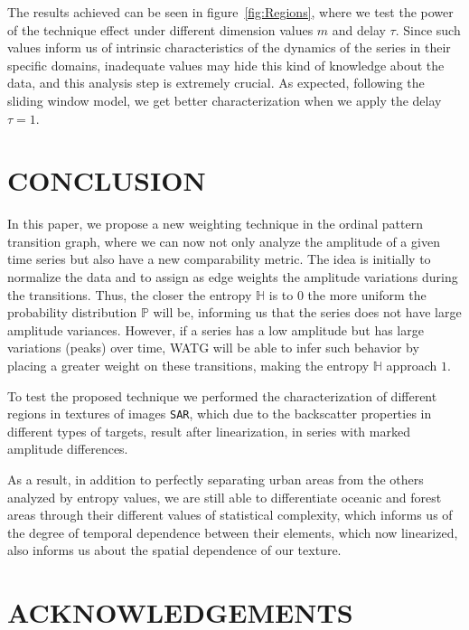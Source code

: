 \documentclass{isprs}
\begin{document}
	The results achieved can be seen in figure~\ref{fig:Regions}, where we test the power of the technique effect under different dimension values $m$ and delay $\tau$.
	Since such values inform us of intrinsic characteristics of the dynamics of the series in their specific domains, inadequate values may hide this kind of knowledge about the data, and this analysis step is extremely crucial.
	As expected, following the sliding window model, we get better characterization when we apply the delay $\tau = 1$.
	
	\section{CONCLUSION}\label{Conclusion}
	
	In this paper, we propose a new weighting technique in the ordinal pattern transition graph, where we can now not only analyze the amplitude of a given time series but also have a new comparability metric.
	The idea is initially to normalize the data and to assign as edge weights the amplitude variations during the transitions.
	Thus, the closer the entropy $\mathbb{H}$ is to $0$ the more uniform the probability distribution $\mathbb{P}$ will be, informing us that the series does not have large amplitude variances.
	However, if a series has a low amplitude but has large variations (peaks) over time, WATG will be able to infer such behavior by placing a greater weight on these transitions, making the entropy $\mathbb{H}$ approach $1$.
	
	To test the proposed technique we performed the characterization of different regions in textures of images \texttt{SAR}, which due to the backscatter properties in different types of targets, result after linearization, in series with marked amplitude differences.
	
	As a result, in addition to perfectly separating urban areas from the others analyzed by entropy values, we are still able to differentiate oceanic and forest areas through their different values of statistical complexity, which informs us of the degree of temporal dependence between their elements, which now linearized, also informs us about the spatial dependence of our texture.
	
	
	
	
	\section*{ACKNOWLEDGEMENTS}\label{ACKNOWLEDGEMENTS}
	
\end{document}
